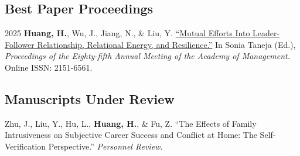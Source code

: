 \documentclass[12pt,letterpaper]{report} %
\begin{document}
    \subsection*{Best Paper Proceedings}

    \begin{tablist}


        \item[2025]\tab{}\textbf{Huang, H.}, Wu, J., Jiang, N., \& Liu, Y. \href{https://journals.aom.org/doi/abs/10.5465/AMPROC.2025.60bp}{\enquote{Mutual Efforts Into Leader-Follower Relationship, Relational Energy, and Resilience.}} In Sonia Taneja (Ed.), \textit{Proceedings of the Eighty-fifth Annual Meeting of the Academy of Management.} Online ISSN: 2151-6561.
        

    \end{tablist}

    \subsection*{Manuscripts Under Review}
    \begin{tablist}
        
        \item[]\tab{}Zhu, J., Liu, Y., Hu, L., \textbf{Huang, H.}, \& Fu, Z. \enquote{The Effects of Family Intrusiveness on Subjective Career Success and Conflict at Home: The Self-Verification Perspective.} \textit{Personnel Review}.
    \end{tablist}
\end{document}
